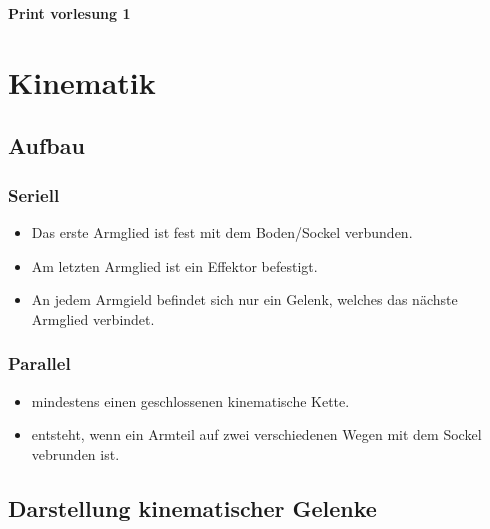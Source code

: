 \begin{minipage}{0.5\linewidth}
\textbf{Print vorlesung 1}
\end{minipage}

\clearpage
\section{Kinematik}
\subsection{Aufbau}
\begin{minipage}{0.5\linewidth}
\subsubsection{Seriell}
\begin{itemize}
    \item Das erste Armglied ist fest mit dem Boden/Sockel verbunden.
    \item Am letzten Armglied ist ein Effektor befestigt.
    \item An jedem Armgield befindet sich nur ein Gelenk, welches das nächste Armglied verbindet.  
\end{itemize}
\end{minipage}
\begin{minipage}{0.5\linewidth}
\subsubsection{Parallel}
\begin{itemize}
    \item mindestens einen geschlossenen kinematische Kette.
    \item entsteht, wenn ein Armteil auf zwei verschiedenen Wegen mit dem Sockel vebrunden ist.
\end{itemize}
\end{minipage}
	\subsection{Darstellung kinematischer Gelenke}

